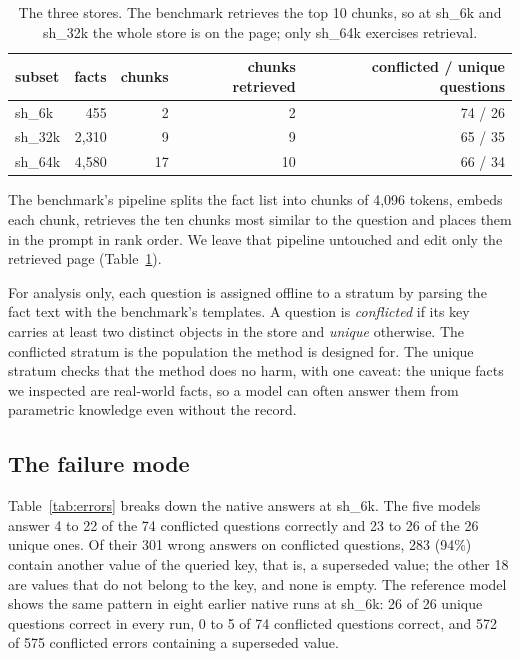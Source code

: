 \documentclass[11pt]{article}
\newcommand{\sub}[1]{\textsf{sh\_#1}}                    %
\begin{document}
\begin{table}[tbp]\centering
\caption{The three stores. The benchmark retrieves the top 10 chunks, so at \sub{6k} and \sub{32k} the whole store is on the page; only \sub{64k} exercises retrieval.}
\label{tab:stores}
\begin{tabular}{lrrrr}\toprule
subset & facts & chunks & chunks retrieved & conflicted / unique questions\\\midrule
\sub{6k}  & 455   & 2  & 2  & 74 / 26\\
\sub{32k} & 2,310 & 9  & 9  & 65 / 35\\
\sub{64k} & 4,580 & 17 & 10 & 66 / 34\\\bottomrule
\end{tabular}\end{table}

The benchmark's pipeline splits the fact list into chunks of 4,096 tokens, embeds each chunk, retrieves the ten chunks most similar to the question and places them in the prompt in rank order. We leave that pipeline untouched and edit only the retrieved page (Table~\ref{tab:stores}).

For analysis only, each question is assigned offline to a stratum by parsing the fact text with the benchmark's templates. A question is \emph{conflicted} if its key carries at least two distinct objects in the store and \emph{unique} otherwise. The conflicted stratum is the population the method is designed for. The unique stratum checks that the method does no harm, with one caveat: the unique facts we inspected are real-world facts, so a model can often answer them from parametric knowledge even without the record.

\subsection{The failure mode}
\label{sec:failure}

Table~\ref{tab:errors} breaks down the native answers at \sub{6k}. The five models answer 4 to 22 of the 74 conflicted questions correctly and 23 to 26 of the 26 unique ones. Of their 301 wrong answers on conflicted questions, 283 (94\%) contain another value of the queried key, that is, a superseded value; the other 18 are values that do not belong to the key, and none is empty. The reference model shows the same pattern in eight earlier native runs at \sub{6k}: 26 of 26 unique questions correct in every run, 0 to 5 of 74 conflicted questions correct, and 572 of 575 conflicted errors containing a superseded value.
\end{document}
